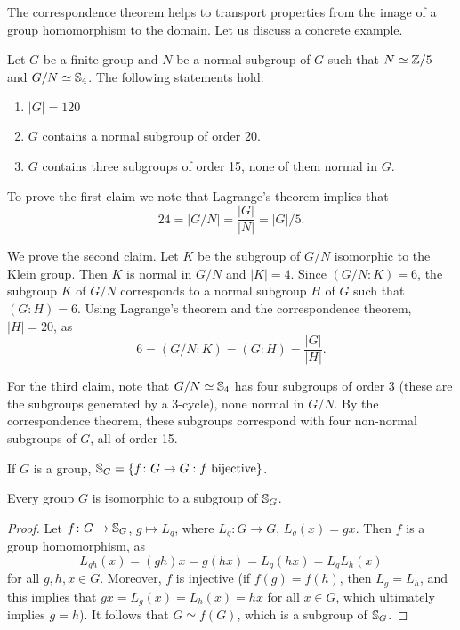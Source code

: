 The correspondence theorem helps to transport  
properties from the image of a group homomorphism 
to the domain. Let us discuss a concrete example. 

\begin{example}
Let $G$ be a finite group and $N$ be a normal subgroup of
$G$ such that $N\simeq\mathbb{Z}/5$ and $G/N\simeq\mathbb{S}_4$. The following statements hold: 
\begin{enumerate}
\item $|G|=120$
\item $G$ contains a normal subgroup of order 20.
\item $G$ contains three subgroups of order 15, none of them normal in $G$.
\end{enumerate}

To prove the first claim we note that 
Lagrange's theorem implies that 
\[
24=|G/N|=\frac{|G|}{|N|}=|G|/5.
\]

We prove the second claim. Let $K$ be the subgroup of $G/N$ isomorphic
to the Klein group. 
Then 
$K$ is normal in $G/N$ and $|K|=4$. Since 
$(G/N:K)=6$,
the subgroup $K$ of $G/N$ corresponds to a normal subgroup $H$ of $G$ such that $(G:H)=6$. Using Lagrange's theorem
and the correspondence theorem, 
$|H|=20$, as 
\[
6=(G/N:K)=(G:H)=\frac{|G|}{|H|}.
\]

For the third claim, note that
$G/N\simeq\mathbb{S}_4$ has four subgroups of order 
 3 (these are the subgroups generated by a 3-cycle),
none normal in $G/N$. By the correspondence theorem, these
subgroups correspond with four non-normal subgroups of $G$, all of order 15. 
\end{example}

If $G$ is a group, $\mathbb{S}_G=\{f\colon G\to G:f\text{ bijective}\}$.

\begin{theorem}[Cayley]
\label{thm:Cayley}
Every group $G$ is isomorphic to a subgroup of $\mathbb{S}_G$.
\end{theorem}

\begin{proof}
Let $f\colon G\to\mathbb{S}_G$, $g\mapsto L_g$, where $L_g\colon G\to G$, $L_g(x)=gx$. Then $f$ is a group homomorphism, as 
\[
L_{gh}(x)=(gh)x=g(hx)=L_g(hx)=L_gL_h(x)
\]
for all $g,h,x\in G$. Moreover, $f$ is injective (if $f(g)=f(h)$, then $L_g=L_h$, and this implies that 
$gx=L_g(x)=L_h(x)=hx$ for all $x\in G$, which ultimately implies $g=h$).
It follows that $G\simeq f(G)$, which is a subgroup of $\mathbb{S}_G$. 
\end{proof}

